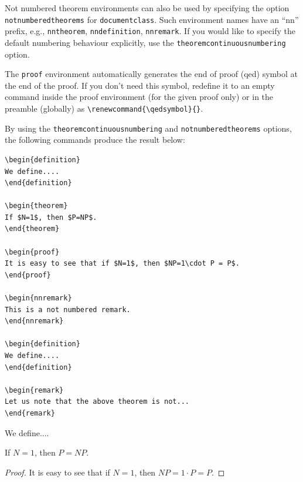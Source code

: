 \documentclass[theoremcontinuousnumbering,withtitlethanks]{actacyb}
\begin{document}
Not numbered theorem environments can also be used by specifying the option \verb|notnumberedtheorems| for \verb|documentclass|. Such environment names have an ``nn'' prefix, e.g., \verb|nntheorem|, \verb|nndefinition|, \verb|nnremark|.
If you would like to specify the default numbering behaviour explicitly, use the
\verb|theoremcontinuousnumbering| option.

The \verb|proof| environment automatically generates the end of proof (qed) symbol
at the end of the proof. If you don't need this symbol, redefine it to an empty command
inside the proof environment (for the given proof only) or in the preamble (globally) as \verb|\renewcommand{\qedsymbol}{}|.

By using the \verb|theoremcontinuousnumbering| and \verb|notnumberedtheorems| options, the following commands produce the result below:

\begin{verbatim}
\begin{definition}
We define....
\end{definition}

\begin{theorem}
If $N=1$, then $P=NP$.
\end{theorem}

\begin{proof}
It is easy to see that if $N=1$, then $NP=1\cdot P = P$.
\end{proof}

\begin{nnremark}
This is a not numbered remark.
\end{nnremark}

\begin{definition}
We define....
\end{definition}

\begin{remark}
Let us note that the above theorem is not...
\end{remark}
\end{verbatim}


\begin{definition}
We define....
\end{definition}

\begin{theorem}
If $N=1$, then $P=NP$.
\end{theorem}

\begin{proof}
It is easy to see that if $N=1$, then $NP=1\cdot P = P$.
\end{proof}
\end{document}
